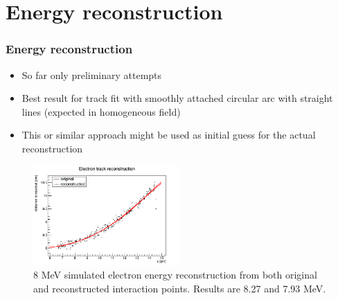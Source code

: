 \documentclass{beamer}
\begin{document}
	\section{Energy reconstruction}
	\begin{frame}
		\frametitle{Energy reconstruction}
		\begin{itemize}
			\item So far only preliminary attempts
			\item Best result for track fit with smoothly attached circular arc with straight lines (expected in homogeneous field)
			\item This or similar approach might be used as initial guess for the actual reconstruction
		\end{itemize}
		\begin{figure}
			\centering
			\includegraphics[width=0.5\textwidth]{images/reco_e.png}
			\caption{8 MeV simulated electron energy reconstruction from both original and reconstructed interaction points. Results are 8.27 and 7.93 MeV.}
		\end{figure}		
	\end{frame}
	
	
\end{document}
